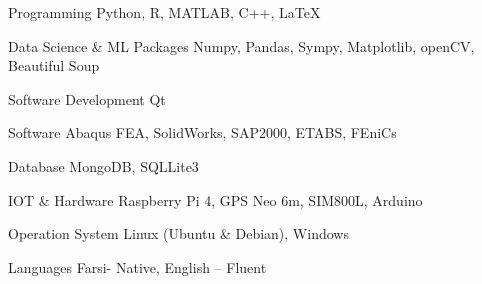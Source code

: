 

\begin{cvskills}

  \cvskill
    {Programming} %
    {Python, R, MATLAB, C++, \LaTeX} %
    
  \cvskill
    {Data Science \& ML Packages} %
    {Numpy, Pandas, Sympy, Matplotlib, openCV, Beautiful Soup} %
     
  \cvskill
    {Software Development} %
    {Qt} %
    
  \cvskill
    {Software} %
    {Abaqus FEA, SolidWorks, SAP2000, ETABS, FEniCs} %

  \cvskill
    {Database} %
    {MongoDB, SQLLite3} %

  \cvskill
	{IOT \& Hardware} %
	{Raspberry Pi 4, GPS Neo 6m, SIM800L, Arduino} %

  \cvskill
	{Operation System} %
	{Linux (Ubuntu \& Debian), Windows} %

  \cvskill
    {Languages} %
    {Farsi- Native, English – Fluent} %
\end{cvskills}
